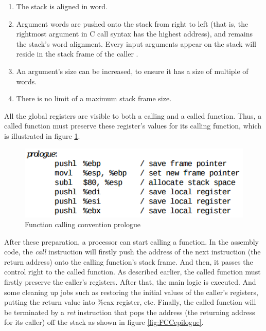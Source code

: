            \begin{enumerate}
                \item The stack is aligned in word.
                \item Argument words are pushed onto the stack from right to left (that is, the rightmost argument in C call syntax has the highest address), and remains the stack's word alignment\cite{SCO-386}. Every input arguments appear on the stack will reside
                in the stack frame of the caller \cite{SCO-386}.
                \item An argument's size can be increased, to ensure it has a size of multiple of words.
                \item There is no limit of a maximum stack frame size.
            \end{enumerate}
            
        All the global registers are visible to both a calling and a called function. Thus, a called function must preserve these register's values for its calling function, which is illustrated in figure \ref{fig:FCCPrologue}.   
        
               \begin{figure}[H]
                    \centering
                    \includegraphics[scale = 0.5]
                    {Images/concepts/FCCPrologue.png}
                    \caption[Function calling convention prologue]%
                    {Function calling convention prologue\cite{SCO-386}}    
                    \label{fig:FCCPrologue}
              \end{figure}
        
        After these preparation, a processor can start calling a function. In the assembly code, the \textit{call} instruction will firstly push the address of the next instruction (the return address) onto the calling function's stack frame. And then, it passes the control right to the called function. As described earlier, the called function must firstly preserve the caller's registers. After that, the main logic is executed. And some cleaning up jobs such as restoring the initial values of the caller's registers, putting the return value into \%eax register, etc. Finally, the called function will be terminated by a \textit{ret} instruction that pops the address (the returning address for its caller) off the stack as shown in figure \ref{fig:FCCepilogue}. 
        

